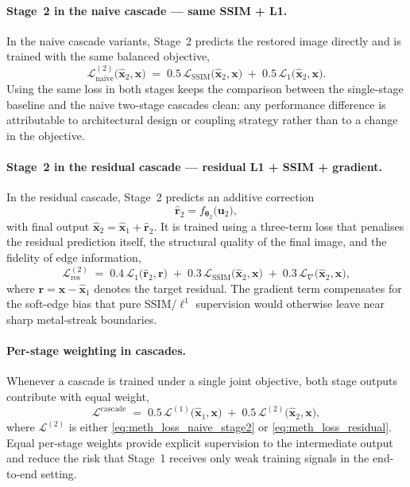 \paragraph{Stage~2 in the naive cascade --- same SSIM + L1.}
In the naive cascade variants, Stage~2 predicts the restored image directly and is trained with the same balanced objective,
\begin{equation}
    \mathcal{L}^{(2)}_{\mathrm{naive}}\!\bigl(\hat{\mathbf{x}}_{2}, \mathbf{x}\bigr)
    \;=\; 0.5\,\mathcal{L}_{\mathrm{SSIM}}\!\bigl(\hat{\mathbf{x}}_{2}, \mathbf{x}\bigr)
    \;+\; 0.5\,\mathcal{L}_{1}\!\bigl(\hat{\mathbf{x}}_{2}, \mathbf{x}\bigr).
    \label{eq:meth_loss_naive_stage2}
\end{equation}
Using the same loss in both stages keeps the comparison between the single-stage baseline and the naive two-stage cascades clean: any performance difference is attributable to architectural design or coupling strategy rather than to a change in the objective.

\paragraph{Stage~2 in the residual cascade --- residual L1 + SSIM + gradient.}
In the residual cascade, Stage~2 predicts an additive correction
\[
    \hat{\mathbf{r}}_{2}
    = f_{\boldsymbol{\theta}_{2}}\!\bigl(\mathbf{u}_2\bigr),
\]
with final output \(\hat{\mathbf{x}}_{2}=\hat{\mathbf{x}}_{1}+\hat{\mathbf{r}}_{2}\). It is trained using a three-term loss that penalises the residual prediction itself, the structural quality of the final image, and the fidelity of edge information,
\begin{equation}
    \mathcal{L}^{(2)}_{\mathrm{res}}
    \;=\; 0.4\,\mathcal{L}_{1}\!\bigl(\hat{\mathbf{r}}_{2}, \mathbf{r}\bigr)
    \;+\; 0.3\,\mathcal{L}_{\mathrm{SSIM}}\!\bigl(\hat{\mathbf{x}}_{2}, \mathbf{x}\bigr)
    \;+\; 0.3\,\mathcal{L}_{\nabla}\!\bigl(\hat{\mathbf{x}}_{2}, \mathbf{x}\bigr),
    \label{eq:meth_loss_residual}
\end{equation}
where \(\mathbf{r}=\mathbf{x}-\hat{\mathbf{x}}_{1}\) denotes the target residual. The gradient term compensates for the soft-edge bias that pure SSIM/\(\ell^{1}\) supervision would otherwise leave near sharp metal-streak boundaries.

\paragraph{Per-stage weighting in cascades.}
Whenever a cascade is trained under a single joint objective, both stage outputs contribute with equal weight,
\begin{equation}
    \mathcal{L}^{\mathrm{cascade}}
    \;=\; 0.5\,\mathcal{L}^{(1)}\!\bigl(\hat{\mathbf{x}}_{1}, \mathbf{x}\bigr)
    \;+\; 0.5\,\mathcal{L}^{(2)}\!\bigl(\hat{\mathbf{x}}_{2}, \mathbf{x}\bigr),
    \label{eq:meth_loss_cascade_weighted}
\end{equation}
where \(\mathcal{L}^{(2)}\) is either \eqref{eq:meth_loss_naive_stage2} or \eqref{eq:meth_loss_residual}. Equal per-stage weights provide explicit supervision to the intermediate output and reduce the risk that Stage~1 receives only weak training signals in the end-to-end setting.

